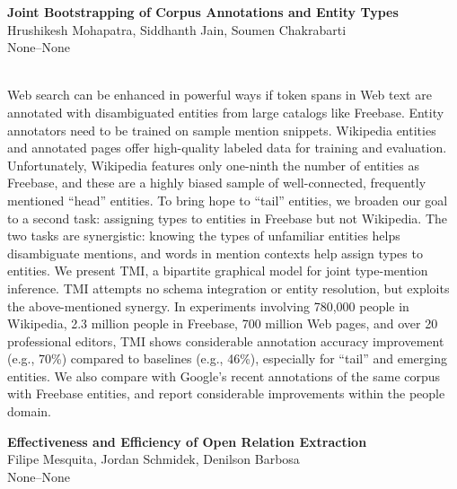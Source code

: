 \documentclass[twoside,makeidx]{book}
\renewcommand{\normalsize}{\fontsize{8}{9}\selectfont}
\renewcommand{\small}{\fontsize{7}{8}\selectfont}
\begin{document}
\begin{minipage}{\linewidth}%
\begin{center}
\textbf{\normalsize Joint Bootstrapping of Corpus Annotations and Entity Types}\\
\normalsize  Hrushikesh Mohapatra,  Siddhanth Jain,  Soumen Chakrabarti\\
{\small None--None}\\
\end{center}
\end{minipage}\\[0.5em]
\nopagebreak%
\noindent%
{\small Web search can be enhanced in powerful ways if token spans in Web text are annotated with disambiguated entities from large catalogs like Freebase.  Entity annotators need to be trained on sample mention snippets.  Wikipedia entities and annotated pages offer high-quality labeled data for training and evaluation.  Unfortunately, Wikipedia features only one-ninth the number of entities as Freebase, and these are a highly biased sample of well-connected, frequently mentioned ``head'' entities.  To bring hope to ``tail'' entities, we broaden our goal to a second task: assigning types to entities in Freebase but not Wikipedia. The two tasks are synergistic: knowing the types of unfamiliar entities helps disambiguate mentions, and words in mention contexts help assign types to entities. We present TMI, a bipartite graphical model for joint type-mention inference.  TMI attempts no schema integration or entity resolution, but exploits the above-mentioned synergy.  In experiments involving 780,000 people in Wikipedia, 2.3 million people in Freebase, 700 million Web pages, and over 20 professional editors, TMI shows considerable annotation accuracy improvement (e.g., 70\%) compared to baselines (e.g., 46\%), especially for ``tail'' and emerging entities.  We also compare with Google's recent annotations of the same corpus with Freebase entities, and report considerable improvements within the people domain.}
\par\vspace{2em}\noindent%
\begin{minipage}{\linewidth}%
\begin{center}
\textbf{\normalsize Effectiveness and Efficiency of Open Relation Extraction}\\
\normalsize  Filipe Mesquita,  Jordan Schmidek,  Denilson Barbosa\\
{\small None--None}\\
\end{center}
\end{minipage}\\[0.5em]
\end{document}

